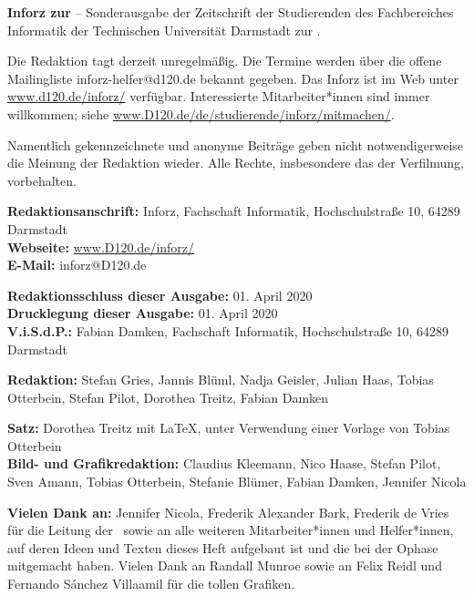 \small

\textbf{Inforz zur \ophase} – Sonderausgabe der Zeitschrift der Studierenden des Fachbereiches Informatik der Technischen Universität Darmstadt zur \ophase.

\vspace{3mm}
Die Redaktion tagt derzeit unregelmäßig. Die Termine werden über die offene Mailingliste inforz-helfer@d120.de bekannt gegeben. Das Inforz ist im Web unter \url{www.d120.de/inforz/} verfügbar. Interessierte Mitarbeiter*innen sind immer willkommen; siehe \url{www.D120.de/de/studierende/inforz/mitmachen/}.

\vspace{3mm}
Namentlich gekennzeichnete und anonyme Beiträge geben nicht notwendigerweise die Meinung der Redaktion wieder. Alle Rechte, insbesondere das der Verfilmung, vorbehalten.


\textbf{Redaktionsanschrift:} Inforz, Fachschaft Informatik, Hochschulstraße 10, 64289 Darmstadt\\
\textbf{Webseite:} \url{www.D120.de/inforz/}\\
\textbf{E-Mail:} inforz@D120.de

\vspace{3mm}
\textbf{Redaktionsschluss dieser Ausgabe:} 01. April 2020\\
\textbf{Drucklegung dieser Ausgabe:} 01. April 2020\\
\textbf{V.i.S.d.P.:} Fabian Damken, Fachschaft Informatik, Hochschulstraße 10, 64289 Darmstadt

\vspace{3mm}
\textbf{Redaktion:} Stefan Gries, Jannis Blüml, Nadja Geisler, Julian Haas, Tobias Otterbein, Stefan Pilot, Dorothea Treitz, Fabian Damken

\vspace{3mm}
\textbf{Satz:} Dorothea Treitz mit \LaTeX, unter Verwendung einer Vorlage von Tobias Otterbein\\
\textbf{Bild- und Grafikredaktion:} Claudius Kleemann, Nico Haase, Stefan Pilot, Sven Amann, Tobias Otterbein, Stefanie Blümer, Fabian Damken, Jennifer Nicola

\vspace{3mm}
\textbf{Vielen Dank an:} Jennifer Nicola, Frederik Alexander Bark, Frederik de Vries für die Leitung der \ophase \  sowie an alle weiteren Mitarbeiter*innen und Helfer*innen, auf deren Ideen und Texten dieses Heft aufgebaut ist und die bei der Ophase mitgemacht haben. Vielen Dank an Randall Munroe sowie an Felix Reidl und Fernando Sánchez Villaamil für die tollen Grafiken.\\

